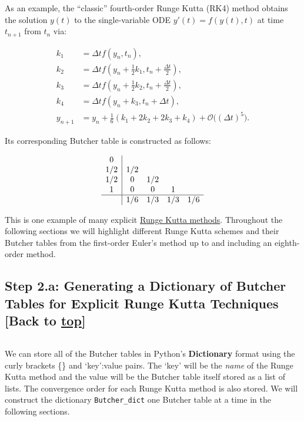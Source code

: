 \documentclass[landscape,letterpaper,10pt,english]{article}
\begin{document}
As an example, the ``classic'' fourth-order Runge Kutta (RK4) method
obtains the solution \(y(t)\) to the single-variable ODE
\(y'(t) = f(y(t),t)\) at time \(t_{n+1}\) from \(t_n\) via:

\begin{align}
k_1 &= \Delta tf(y_n, t_n), \\
k_2 &= \Delta tf(y_n + \frac{1}{2}k_1, t_n + \frac{\Delta t}{2}), \\
k_3 &= \Delta tf(y_n + \frac{1}{2}k_2, t_n + \frac{\Delta t}{2}), \\
k_4 &= \Delta tf(y_n + k_3, t_n + \Delta t), \\
y_{n+1} &= y_n + \frac{1}{6}(k_1 + 2k_2 + 2k_3 + k_4) + \mathcal{O}\big((\Delta t)^5\big).
\end{align}

Its corresponding Butcher table is constructed as follows:

\[\begin{array}{c|cccc}
    0 & \\
    1/2 & 1/2 & \\ 
    1/2 & 0 & 1/2 & \\
    1 & 0 & 0 & 1 & \\ \hline
     & 1/6 & 1/3 & 1/3 & 1/6
\end{array} \]

This is one example of many explicit
\href{https://en.wikipedia.org/w/index.php?title=List_of_Runge\%E2\%80\%93Kutta_methods\&oldid=896594269}{Runge
Kutta methods}. Throughout the following sections we will highlight
different Runge Kutta schemes and their Butcher tables from the
first-order Euler's method up to and including an eighth-order method.

    \hypertarget{step-2.a-generating-a-dictionary-of-butcher-tables-for-explicit-runge-kutta-techniques-back-to-top}{%
\subsection{\texorpdfstring{Step 2.a: Generating a Dictionary of Butcher
Tables for Explicit Runge Kutta Techniques {[}Back to
\hyperref[toc]{top}{]}}{Step 2.a: Generating a Dictionary of Butcher Tables for Explicit Runge Kutta Techniques {[}Back to {]}}}\label{step-2.a-generating-a-dictionary-of-butcher-tables-for-explicit-runge-kutta-techniques-back-to-top}}

\[\label{codebutcher}\]

We can store all of the Butcher tables in Python's \textbf{Dictionary}
format using the curly brackets \{\} and `key':value pairs. The `key'
will be the \emph{name} of the Runge Kutta method and the value will be
the Butcher table itself stored as a list of lists. The convergence
order for each Runge Kutta method is also stored. We will construct the
dictionary \texttt{Butcher\_dict} one Butcher table at a time in the
following sections.
\end{document}
